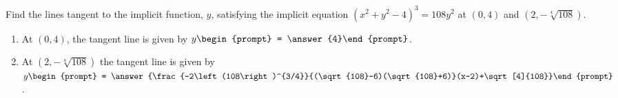 \documentclass{ximera}
\author{Gregory Hartman \and Matthew Carr}
\begin{document}
\begin{exercise}




Find the lines tangent to the implicit function, $y$, satisfying the implicit equation $(x^2+y^2-4)^3=108y^2$ at $(0,4)$ and $(2,-\sqrt[4]{108})$.

\begin{enumerate}
\item At $(0,4)$, the tangent line is given by $y\begin{prompt} = \answer{4}\end{prompt}$.
\item At $(2,-\sqrt[4]{108})$ the tangent line is given by $y\begin{prompt} = \answer{\frac{-2\left(108\right)^{3/4}}{(\sqrt{108}-6)(\sqrt{108}+6)}(x-2)+\sqrt[4]{108}}\end{prompt}$.
\end{enumerate}


\end{exercise}
\end{document}
